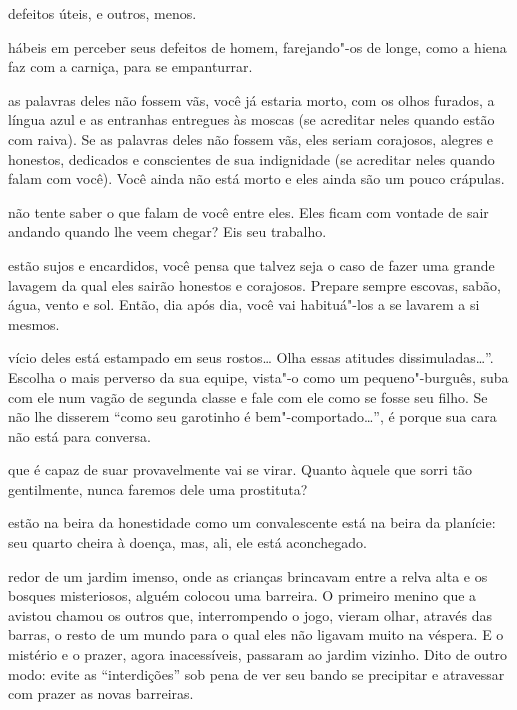 \pagebreak
\thispagestyle{empty}

\movetooddpage

 defeitos úteis, e outros, menos.



 hábeis em perceber seus defeitos de homem, farejando"-os de longe,
como a hiena faz com a carniça, para se empanturrar.



 as palavras deles não fossem vãs, você já estaria morto, com os olhos
furados, a língua azul e as entranhas entregues às moscas (se acreditar
neles quando estão com raiva). Se as palavras deles não fossem vãs, eles
seriam corajosos, alegres e honestos, dedicados e conscientes de sua
indignidade (se acreditar neles quando falam com você). Você ainda não
está morto e eles ainda são um pouco crápulas.



 não tente saber o que falam de você entre eles. Eles ficam
com vontade de sair andando quando lhe veem chegar? Eis seu trabalho.



 estão sujos e encardidos, você pensa que talvez seja o caso de
fazer uma grande lavagem da qual eles sairão honestos e corajosos.
Prepare sempre escovas, sabão, água, vento e sol. Então, dia após dia,
você vai habituá"-los a se lavarem a si mesmos.

\pagebreak

 vício deles está estampado em seus rostos\ldots{} Olha essas atitudes
dissimuladas\ldots{}''. Escolha o mais perverso da sua equipe, vista"-o como
um pequeno"-burguês, suba com ele num vagão de segunda classe e fale com
ele como se fosse seu filho. Se não lhe disserem ``como seu garotinho é
bem"-comportado\ldots{}'', é porque sua cara não está para conversa.



 que é capaz de suar provavelmente vai se virar. Quanto àquele que
sorri tão gentilmente, nunca faremos dele uma prostituta?



 estão na beira da honestidade como um convalescente está na beira
da planície: seu quarto cheira à doença, mas, ali, ele está aconchegado.



\pagebreak

 redor de um jardim imenso, onde as crianças brincavam entre a relva
alta e os bosques misteriosos, alguém colocou uma barreira. O primeiro
menino que a avistou chamou os outros que, interrompendo o jogo, vieram
olhar, através das barras, o resto de um mundo para o qual eles não
ligavam muito na véspera. E o mistério e o prazer, agora inacessíveis,
passaram ao jardim vizinho. Dito de outro modo: evite as ``interdições''
sob pena de ver seu bando se precipitar e atravessar com prazer as novas
barreiras. 



